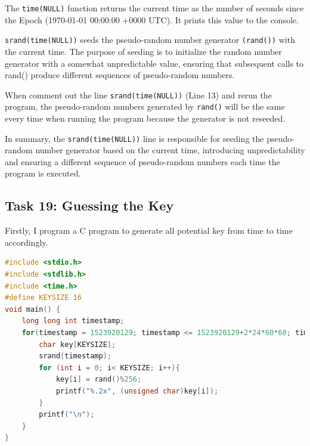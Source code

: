 \documentclass[a4paper]{article}
\begin{document}
The \verb|time(NULL)| function returns the current time as the number of seconds since the Epoch (1970-01-01 00:00:00 +0000 UTC). It prints this value to the console.

\verb|srand(time(NULL))| seeds the pseudo-random number generator \verb|(rand())| with the current time. The purpose of seeding is to initialize the random number generator with a somewhat unpredictable value, ensuring that subsequent calls to rand() produce different sequences of pseudo-random numbers.

When comment out the line \verb|srand(time(NULL))| (Line 13) and rerun the program, the pseudo-random numbers generated by \verb|rand()| will be the same every time when running the program because the generator is not reseeded. 

In summary, the \verb|srand(time(NULL))| line is responsible for seeding the pseudo-random number generator based on the current time, introducing unpredictability and ensuring a different sequence of pseudo-random numbers each time the program is executed.

\subsection{Task 19: Guessing the Key}
Firstly, I program a C program to generate all potential key from time to time accordingly.
\begin{lstlisting}[caption={C Program Code for Generating Keys},label={lst:task19-1},language=C,breaklines=true]
#include <stdio.h>
#include <stdlib.h>
#include <time.h>
#define KEYSIZE 16
void main() {
    long long int timestamp;
    for(timestamp = 1523920129; timestamp <= 1523920129+2*24*60*60; timestamp++) {
        char key[KEYSIZE];
        srand(timestamp);
        for (int i = 0; i< KEYSIZE; i++){
            key[i] = rand()%256;
            printf("%.2x", (unsigned char)key[i]);
        }
        printf("\n");
    }
}
\end{lstlisting} 
\end{document}
